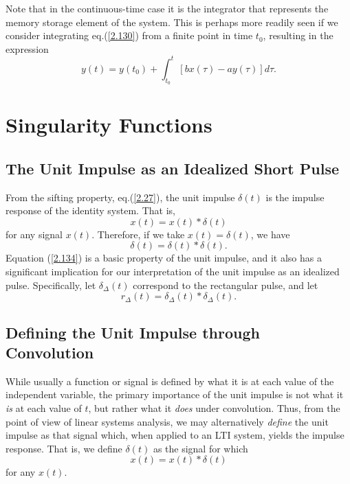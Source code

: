 \documentclass[a4paper,10pt,twoside]{book}
\begin{document}
Note that in the continuous-time case it is the integrator that represents the memory storage element of the system. This is perhaps more readily seen if we consider integrating eq.\;(\ref{2.130}) from a finite point in time $t_0$, resulting in the expression
\begin{equation}
    y(t) = y(t_0)+\int_{t_0}^t\left[bx(\tau)-ay(\tau)\right]d\tau.
    \label{2.132}
\end{equation}

\section{Singularity Functions}
\subsection{The Unit Impulse as an Idealized Short Pulse}

From the sifting property, eq.\;(\ref{2.27}), the unit impulse $\delta(t)$ is the impulse response of the identity system. That is,
\begin{equation}
    x(t)=x(t)*\delta(t)
    \label{2.133}
\end{equation}
for any signal $x(t)$. Therefore, if we take $x(t)=\delta(t)$, we have
\begin{equation}
    \delta(t)=\delta(t)*\delta(t).
    \label{2.134}
\end{equation}
Equation (\ref{2.134}) is a basic property of the unit impulse, and it also has a significant implication for our interpretation of the unit impulse as an idealized pulse. Specifically, let $\delta_\Delta(t)$ correspond to the rectangular pulse, and let
\begin{equation}
    r_\Delta(t)=\delta_\Delta(t)*\delta_\Delta(t).
    \label{2.135}
\end{equation}

\subsection{Defining the Unit Impulse through Convolution}

While usually a function or signal is defined by what it is at each value of the independent variable, the primary importance of the unit impulse is not what it \textit{is} at each value of $t$, but rather what it \textit{does} under convolution. Thus, from the point of view of linear systems analysis, we may alternatively \textit{define} the unit impulse as that signal which, when applied to an LTI system, yields the impulse response. That is, we define $\delta(t)$ as the signal for which
\begin{equation}
    x(t)=x(t)*\delta(t)
    \label{2.138}
\end{equation}
for any $x(t)$.
\end{document}
